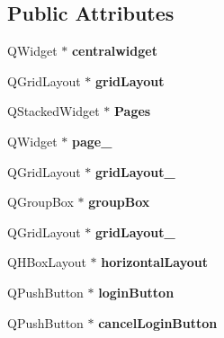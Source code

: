 \subsection*{Public Attributes}
\begin{DoxyCompactItemize}
\item 
\mbox{\label{class_ui__admin_window_ad17f51669733a04a3298e884a350194b}} 
Q\+Widget $\ast$ {\bfseries centralwidget}
\item 
\mbox{\label{class_ui__admin_window_aa3a79e2d7edd5d88b73ccbbba6e0c92d}} 
Q\+Grid\+Layout $\ast$ {\bfseries grid\+Layout}
\item 
\mbox{\label{class_ui__admin_window_a13ee2305bf4bdd76d36e4cf0222c5069}} 
Q\+Stacked\+Widget $\ast$ {\bfseries Pages}
\item 
\mbox{\label{class_ui__admin_window_a43315add4afee6168fa9ada5e3ef1dbe}} 
Q\+Widget $\ast$ {\bfseries page\+\_}
\item 
\mbox{\label{class_ui__admin_window_a2e6136e8cebb19db3f32870556391d04}} 
Q\+Grid\+Layout $\ast$ {\bfseries grid\+Layout\+\_}
\item 
\mbox{\label{class_ui__admin_window_a160899f1a14d8bf803aca76f9fd28bfd}} 
Q\+Group\+Box $\ast$ {\bfseries group\+Box}
\item 
\mbox{\label{class_ui__admin_window_a4177cf23c76973765b5de9df513f98c0}} 
Q\+Grid\+Layout $\ast$ {\bfseries grid\+Layout\+\_}
\item 
\mbox{\label{class_ui__admin_window_ab0dedb04b39cd934a969d61be8333e69}} 
Q\+H\+Box\+Layout $\ast$ {\bfseries horizontal\+Layout}
\item 
\mbox{\label{class_ui__admin_window_a2ca0970e8d04aa05e5111e8ab01d6756}} 
Q\+Push\+Button $\ast$ {\bfseries login\+Button}
\item 
\mbox{\label{class_ui__admin_window_a4d344ddf2dcc0bd7d9a08f24907c4863}} 
Q\+Push\+Button $\ast$ {\bfseries cancel\+Login\+Button}

\end{DoxyCompactItemize}

